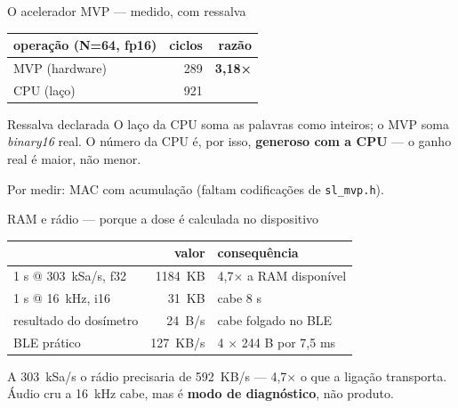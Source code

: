 \documentclass[aspectratio=169,10pt]{beamer}
\begin{document}
\begin{frame}{O acelerador MVP — medido, com ressalva}
  \begin{center}
  \begin{tabular}{lrr}
    \toprule
    operação (N=64, fp16) & ciclos & razão \\
    \midrule
    MVP (hardware)  & 289 & \textbf{3,18×} \\
    CPU (laço)      & 921 & \\
    \bottomrule
  \end{tabular}
  \end{center}
  \vspace{0.3cm}
  \begin{alertblock}{Ressalva declarada}
    O laço da CPU soma as palavras como inteiros; o MVP soma \emph{binary16} real. O número da
    CPU é, por isso, \textbf{generoso com a CPU} — o ganho real é maior, não menor.
  \end{alertblock}
  \footnotesize Por medir: MAC com acumulação (faltam codificações de \texttt{sl\_mvp.h}).
\end{frame}

\begin{frame}{RAM e rádio — porque a dose é calculada no dispositivo}
  \begin{center}
  \begin{tabular}{lrl}
    \toprule
    & valor & consequência \\
    \midrule
    1 s @ \SI{303}{kSa/s}, f32 & \SI{1184}{KB} & 4,7× a RAM disponível \\
    1 s @ \SI{16}{kHz}, i16    & \SI{31}{KB}   & cabe 8 s \\
    resultado do dosímetro     & \SI{24}{B/s}  & cabe folgado no BLE \\
    BLE prático                & \SI{127}{KB/s} & 4 × 244 B por 7,5 ms \\
    \bottomrule
  \end{tabular}
  \end{center}
  \vspace{0.3cm}
  A \SI{303}{kSa/s} o rádio precisaria de \SI{592}{KB/s} — 4,7× o que a ligação transporta.
  Áudio cru a \SI{16}{kHz} cabe, mas é \textbf{modo de diagnóstico}, não produto.
\end{frame}
\end{document}
